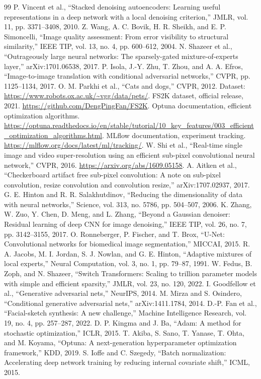 \documentclass[conference]{IEEEtran}
\begin{document}
\begin{thebibliography}{99}
 P. Vincent et al., ``Stacked denoising autoencoders: Learning useful representations in a deep network with a local denoising criterion,'' JMLR, vol. 11, pp. 3371--3408, 2010.
 Z. Wang, A. C. Bovik, H. R. Sheikh, and E. P. Simoncelli, ``Image quality assessment: From error visibility to structural similarity,'' IEEE TIP, vol. 13, no. 4, pp. 600--612, 2004.
 N. Shazeer et al., ``Outrageously large neural networks: The sparsely-gated mixture-of-experts layer,'' arXiv:1701.06538, 2017.
 P. Isola, J.-Y. Zhu, T. Zhou, and A. A. Efros, ``Image-to-image translation with conditional adversarial networks,'' CVPR, pp. 1125--1134, 2017.
 O. M. Parkhi et al., ``Cats and dogs,'' CVPR, 2012. Dataset: \url{https://www.robots.ox.ac.uk/~vgg/data/pets/}.
 FS2K dataset, official release, 2021. \url{https://github.com/DengPingFan/FS2K}.
 Optuna documentation, efficient optimization algorithms. \url{https://optuna.readthedocs.io/en/stable/tutorial/10_key_features/003_efficient_optimization_algorithms.html}.
 MLflow documentation, experiment tracking. \url{https://mlflow.org/docs/latest/ml/tracking/}.
 W. Shi et al., ``Real-time single image and video super-resolution using an efficient sub-pixel convolutional neural network,'' CVPR, 2016. \url{https://arxiv.org/abs/1609.05158}.
 A. Aitken et al., ``Checkerboard artifact free sub-pixel convolution: A note on sub-pixel convolution, resize convolution and convolution resize,'' arXiv:1707.02937, 2017.
 G. E. Hinton and R. R. Salakhutdinov, ``Reducing the dimensionality of data with neural networks,'' Science, vol. 313, no. 5786, pp. 504--507, 2006.
 K. Zhang, W. Zuo, Y. Chen, D. Meng, and L. Zhang, ``Beyond a Gaussian denoiser: Residual learning of deep CNN for image denoising,'' IEEE TIP, vol. 26, no. 7, pp. 3142--3155, 2017.
 O. Ronneberger, P. Fischer, and T. Brox, ``U-Net: Convolutional networks for biomedical image segmentation,'' MICCAI, 2015.
 R. A. Jacobs, M. I. Jordan, S. J. Nowlan, and G. E. Hinton, ``Adaptive mixtures of local experts,'' Neural Computation, vol. 3, no. 1, pp. 79--87, 1991.
 W. Fedus, B. Zoph, and N. Shazeer, ``Switch Transformers: Scaling to trillion parameter models with simple and efficient sparsity,'' JMLR, vol. 23, no. 120, 2022.
 I. Goodfellow et al., ``Generative adversarial nets,'' NeurIPS, 2014.
 M. Mirza and S. Osindero, ``Conditional generative adversarial nets,'' arXiv:1411.1784, 2014.
 D.-P. Fan et al., ``Facial-sketch synthesis: A new challenge,'' Machine Intelligence Research, vol. 19, no. 4, pp. 257--287, 2022.
 D. P. Kingma and J. Ba, ``Adam: A method for stochastic optimization,'' ICLR, 2015.
 T. Akiba, S. Sano, T. Yanase, T. Ohta, and M. Koyama, ``Optuna: A next-generation hyperparameter optimization framework,'' KDD, 2019.
 S. Ioffe and C. Szegedy, ``Batch normalization: Accelerating deep network training by reducing internal covariate shift,'' ICML, 2015.
\end{thebibliography}
\end{document}
